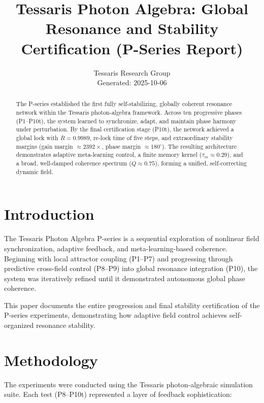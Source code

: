\documentclass[conference]{IEEEtran}
\title{Tessaris Photon Algebra: Global Resonance and Stability Certification (P-Series Report)}
\author{Tessaris Research Group \\ Generated: 2025-10-06}
\begin{document}
\maketitle

\begin{abstract}
The P-series established the first fully self-stabilizing, globally coherent resonance network within the Tessaris photon-algebra framework. Across ten progressive phases (P1--P10t), the system learned to synchronize, adapt, and maintain phase harmony under perturbation. By the final certification stage (P10t), the network achieved a global lock with $\bar{R}=0.9989$, re-lock time of five steps, and extraordinary stability margins (gain margin $\approx 2392\times$, phase margin $\approx 180^\circ$). The resulting architecture demonstrates adaptive meta-learning control, a finite memory kernel ($\tau_m\approx0.29$), and a broad, well-damped coherence spectrum ($Q\approx0.75$), forming a unified, self-correcting dynamic field.
\end{abstract}

\section{Introduction}
The Tessaris Photon Algebra P-series is a sequential exploration of nonlinear field synchronization, adaptive feedback, and meta-learning-based coherence. Beginning with local attractor coupling (P1--P7) and progressing through predictive cross-field control (P8--P9) into global resonance integration (P10), the system was iteratively refined until it demonstrated autonomous global phase coherence.

This paper documents the entire progression and final stability certification of the P-series experiments, demonstrating how adaptive field control achieves self-organized resonance stability.

\section{Methodology}
The experiments were conducted using the Tessaris photon-algebraic simulation suite. Each test (P8--P10t) represented a layer of feedback sophistication:
\end{document}
